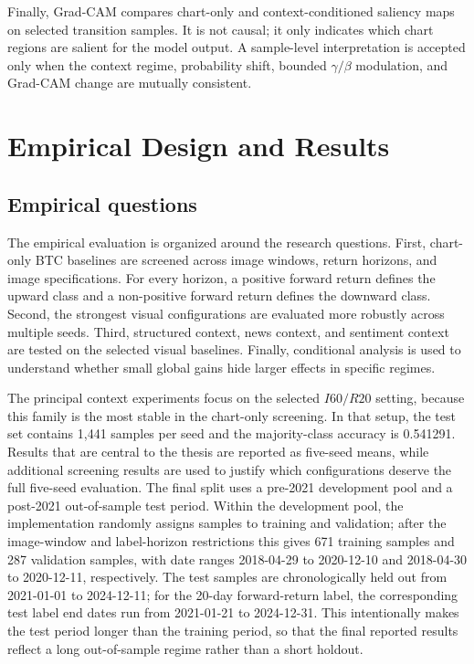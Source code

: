 \documentclass[14pt,a4paper]{extarticle}
\begin{document}
Finally, Grad-CAM compares chart-only and context-conditioned saliency maps on selected transition samples. It is not causal; it only indicates which chart regions are salient for the model output. A sample-level interpretation is accepted only when the context regime, probability shift, bounded $\gamma/\beta$ modulation, and Grad-CAM change are mutually consistent.

\clearpage

\section{Empirical Design and Results}

\subsection{Empirical questions}

The empirical evaluation is organized around the research questions. First, chart-only BTC baselines are screened across image windows, return horizons, and image specifications. For every horizon, a positive forward return defines the upward class and a non-positive forward return defines the downward class. Second, the strongest visual configurations are evaluated more robustly across multiple seeds. Third, structured context, news context, and sentiment context are tested on the selected visual baselines. Finally, conditional analysis is used to understand whether small global gains hide larger effects in specific regimes.

The principal context experiments focus on the selected $I60/R20$ setting, because this family is the most stable in the chart-only screening. In that setup, the test set contains 1,441 samples per seed and the majority-class accuracy is 0.541291. Results that are central to the thesis are reported as five-seed means, while additional screening results are used to justify which configurations deserve the full five-seed evaluation. The final split uses a pre-2021 development pool and a post-2021 out-of-sample test period. Within the development pool, the implementation randomly assigns samples to training and validation; after the image-window and label-horizon restrictions this gives 671 training samples and 287 validation samples, with date ranges 2018-04-29 to 2020-12-10 and 2018-04-30 to 2020-12-11, respectively. The test samples are chronologically held out from 2021-01-01 to 2024-12-11; for the 20-day forward-return label, the corresponding test label end dates run from 2021-01-21 to 2024-12-31. This intentionally makes the test period longer than the training period, so that the final reported results reflect a long out-of-sample regime rather than a short holdout.
\end{document}
